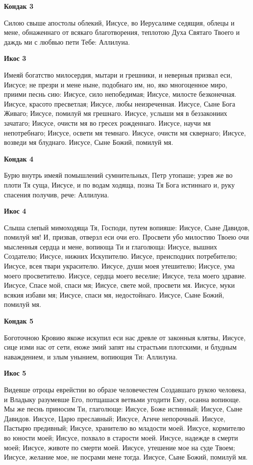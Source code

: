 \medskip
\bfseries Кондак 3\normalfont{}


Силою
свыше апостолы облекий, Иисусе, во Иерусалиме седящия, облецы и мене, обнаженнаго от всякаго благотворения, теплотою Духа Святаго Твоего и даждь ми с любвью пети Тебе: Аллилуиа.


\medskip
\bfseries Икос 3\normalfont{}


Имеяй
богатство милосердия, мытари и грешники, и неверныя призвал еси, Иисусе; не презри и мене ныне, подобнаго им, но, яко многоценное миро, приими песнь сию: Иисусе, сило непобедимая; Иисусе, милосте
безконечная. Иисусе, красото пресветлая; Иисусе, любы неизреченная. Иисусе, Сыне Бога Живаго; Иисусе, помилуй мя грешнаго. Иисусе, услыши мя в беззакониих зачатаго; Иисусе, очисти мя во гресех рожденнаго. Иисусе, научи мя непотребнаго; Иисусе, освети мя темнаго. Иисусе, очисти мя сквернаго; Иисусе, возведи мя блуднаго. Иисусе, Сыне Божий, помилуй мя.


\medskip
\bfseries Кондак 4\normalfont{}


Бурю
внутрь имеяй помышлений сумнительных, Петр утопаше; узрев же во плоти Тя суща, Иисусе, и по водам ходяща, позна Тя Бога истиннаго и, руку спасения получив, рече: Аллилуиа. 


\medskip
\bfseries Икос 4\normalfont{}


Слыша
слепый мимоходяща Тя, Господи, путем вопияше: Иисусе, Сыне Давидов, помилуй мя! И, призвав, отверзл еси очи его. Просвети убо милостию Твоею очи мысленныя сердца и мене, вопиюща Ти и глаголюща: Иисусе, вышних Создателю; Иисусе, нижних Искупителю. Иисусе, преисподних потребителю; Иисусе, всея твари украсителю. Иисусе, души моея утешителю; Иисусе, ума моего просветителю. Иисусе, сердца моего веселие; Иисусе, тела моего здравие. Иисусе, Спасе мой, спаси мя; Иисусе, свете мой, просвети мя. Иисусе, муки всякия избави мя; Иисусе, спаси мя, недостойнаго. Иисусе, Сыне Божий, помилуй мя.


\medskip
\bfseries Кондак 5\normalfont{}


Боготочною
Кровию якоже искупил еси нас древле от законныя клятвы, Иисусе, сице изми нас от сети, еюже змий запят ны страстьми плотскими, и блудным наваждением, и злым унынием, вопиющия Ти: Аллилуиа.


\medskip
\bfseries Икос 5\normalfont{}


Видевше
отроцы еврейстии во образе человечестем Создавшаго рукою человека, и Владыку разумевше Его, потщашася ветвьми угодити Ему, осанна вопиюще. Мы же песнь приносим Ти, глаголюще: Иисусе, Боже истинный; Иисусе, Сыне Давидов. Иисусе, Царю преславный; Иисусе, Агнче непорочный. Иисусе, Пастырю предивный; Иисусе, хранителю во младости моей. Иисусе, кормителю во юности моей; Иисусе, похвало в старости моей. Иисусе, надежде в смерти моей; Иисусе, животе по смерти моей. Иисусе, утешение мое на суде Твоем; Иисусе, желание мое, не посрами мене тогда. Иисусе, Сыне Божий, помилуй мя.


